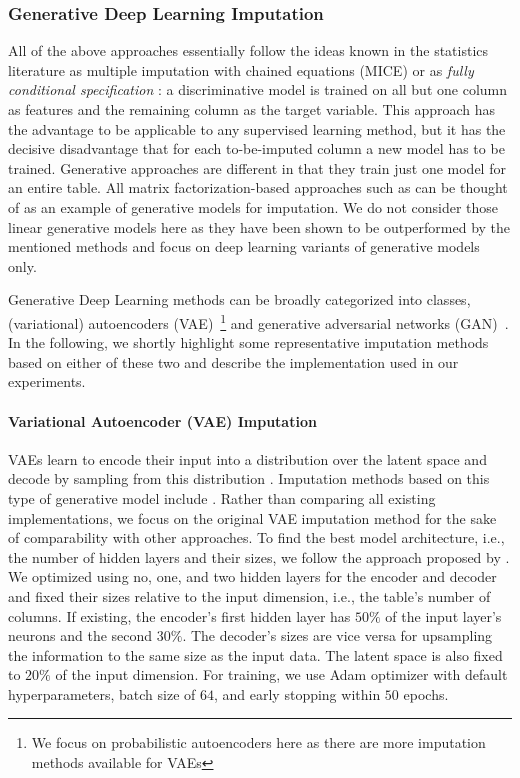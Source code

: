 \subsubsection{Generative Deep Learning Imputation}
\label{sec:generative_imputation}
%
All of the above approaches essentially follow the ideas known in the statistics literature as multiple imputation with chained equations (MICE) \citep{Little} or as {\em fully conditional specification} \citep{vanBuuren2018}: a discriminative model is trained on all but one column as features and the remaining column as the target variable. This approach has the advantage to be applicable to any supervised learning method, but it has the decisive disadvantage that for each to-be-imputed column a new model has to be trained. Generative approaches are different in that they train just one model for an entire table. All matrix factorization-based approaches such as \citep{Troyanskaya2001,Koren2009,Mazumder2010} can be thought of as an example of generative models for imputation. We do not consider those linear generative models here as they have been shown to be outperformed by the mentioned methods and focus on deep learning variants of generative models only.

Generative Deep Learning methods can be broadly categorized into classes, (variational) autoencoders (VAE)~\citep{VAE}\footnote{We focus on probabilistic autoencoders here as there are more imputation methods available for VAEs} and generative adversarial networks (GAN)~\citep{GAN}. In the following, we shortly highlight some representative imputation methods based on either of these two and describe the implementation used in our experiments.

\paragraph{Variational Autoencoder (VAE) Imputation}
%
VAEs learn to encode their input into a distribution over the latent space and decode by sampling from this distribution \citep{VAE}. Imputation methods based on this type of generative model include \cite{HIVAE, VAE_for_genomic_data, VAEM}. Rather than comparing all existing implementations, we focus on the original VAE imputation method for the sake of comparability with other approaches. To find the best model architecture, i.e., the number of hidden layers and their sizes, we follow the approach proposed by \cite{CaminoVAE}. We optimized using no, one, and two hidden layers for the encoder and decoder and fixed their sizes relative to the input dimension, i.e., the table's number of columns. If existing, the encoder's first hidden layer has $50\%$ of the input layer's neurons and the second $30\%$. The decoder's sizes are vice versa for upsampling the information to the same size as the input data. The latent space is also fixed to $20\%$ of the input dimension.
For training, we use Adam optimizer with default hyperparameters, batch size of $64$, and early stopping within $50$ epochs.


